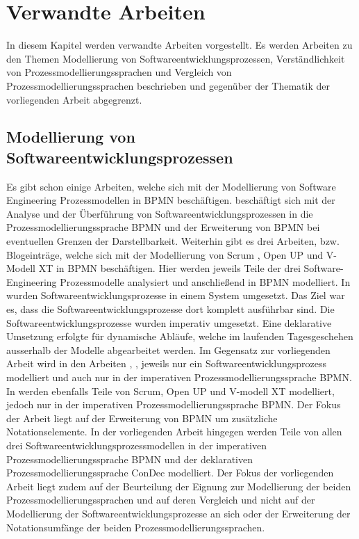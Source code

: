 \chapter{Verwandte Arbeiten}\label{sec:chapter9}

In diesem Kapitel werden verwandte Arbeiten vorgestellt. Es werden Arbeiten zu den Themen Modellierung von Softwareentwicklungsprozessen, Verständlichkeit von Prozessmodellierungssprachen und Vergleich von Prozessmodellierungssprachen beschrieben und gegenüber der Thematik der vorliegenden Arbeit abgegrenzt.

\section{Modellierung von Softwareentwicklungsprozessen}

Es gibt schon einige Arbeiten, welche sich mit der Modellierung von Software Engineering Prozessmodellen in BPMN beschäftigen.
\cite{Menhorn2014} beschäftigt sich mit der Analyse und der Überführung von Softwareentwicklungsprozessen in die Prozessmodellierungssprache BPMN und der Erweiterung von BPMN bei eventuellen Grenzen der Darstellbarkeit.\newline
Weiterhin gibt es drei Arbeiten, bzw. Blogeinträge, welche sich mit der Modellierung von Scrum \cite{software}, Open UP \cite{brunner2007fallstudie} und \cite{Bregenzer2014} V-Modell XT in BPMN beschäftigen. Hier werden jeweils Teile der drei Software-Engineering Prozessmodelle analysiert und anschließend in BPMN modelliert.\newline
In \cite{sabrina734, sabrina758, sabrina795} wurden Softwareentwicklungsprozesse in einem System umgesetzt. Das Ziel war es, dass die Softwareentwicklungsprozesse dort komplett ausführbar sind. Die Softwareentwicklungsprozesse wurden imperativ umgesetzt. Eine deklarative Umsetzung erfolgte für dynamische Abläufe, welche im laufenden Tagesgeschehen ausserhalb der Modelle abgearbeitet werden.\newline
 Im Gegensatz zur vorliegenden Arbeit wird in den Arbeiten \cite{software}, \cite{brunner2007fallstudie}, \cite{Bregenzer2014} jeweils nur ein Softwareentwicklungsprozess modelliert und auch nur in der imperativen Prozessmodellierungssprache BPMN. In \cite{Menhorn2014} werden ebenfalls Teile von Scrum, Open UP und V-modell XT modelliert, jedoch nur in der imperativen Prozessmodellierungssprache BPMN. Der Fokus der Arbeit \cite{Menhorn2014} liegt auf der Erweiterung von BPMN um zusätzliche Notationselemente.\newline
In der vorliegenden Arbeit hingegen werden Teile von allen drei Softwareentwicklungsprozessmodellen in der imperativen Prozessmodellierungssprache BPMN und der deklarativen Prozessmodellierungssprache ConDec modelliert. Der Fokus der vorliegenden Arbeit liegt zudem auf der Beurteilung der Eignung zur Modellierung der beiden Prozessmodellierungssprachen und auf deren Vergleich und nicht auf der Modellierung der Softwareentwicklungsprozesse an sich oder der Erweiterung der Notationsumfänge der beiden Prozessmodellierungssprachen.\newline


